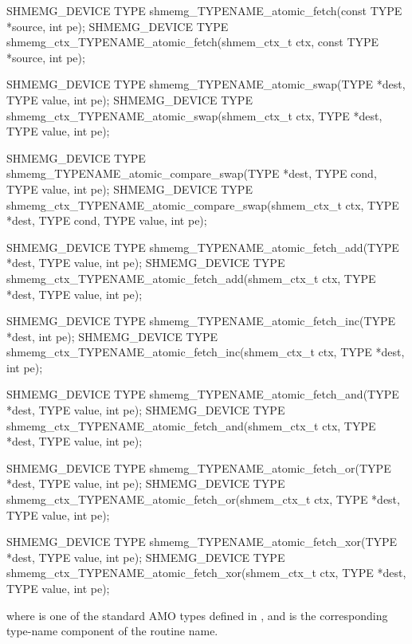 \begin{apidefinition}
\begin{Csynopsis}
SHMEMG_DEVICE TYPE shmemg_TYPENAME_atomic_fetch(const TYPE *source, int pe);
SHMEMG_DEVICE TYPE shmemg_ctx_TYPENAME_atomic_fetch(shmem_ctx_t ctx,
    const TYPE *source, int pe);

SHMEMG_DEVICE TYPE shmemg_TYPENAME_atomic_swap(TYPE *dest, TYPE value, int pe);
SHMEMG_DEVICE TYPE shmemg_ctx_TYPENAME_atomic_swap(shmem_ctx_t ctx,
    TYPE *dest, TYPE value, int pe);

SHMEMG_DEVICE TYPE shmemg_TYPENAME_atomic_compare_swap(TYPE *dest,
    TYPE cond, TYPE value, int pe);
SHMEMG_DEVICE TYPE shmemg_ctx_TYPENAME_atomic_compare_swap(shmem_ctx_t ctx,
    TYPE *dest, TYPE cond, TYPE value, int pe);

SHMEMG_DEVICE TYPE shmemg_TYPENAME_atomic_fetch_add(TYPE *dest,
    TYPE value, int pe);
SHMEMG_DEVICE TYPE shmemg_ctx_TYPENAME_atomic_fetch_add(shmem_ctx_t ctx,
    TYPE *dest, TYPE value, int pe);

SHMEMG_DEVICE TYPE shmemg_TYPENAME_atomic_fetch_inc(TYPE *dest, int pe);
SHMEMG_DEVICE TYPE shmemg_ctx_TYPENAME_atomic_fetch_inc(shmem_ctx_t ctx,
    TYPE *dest, int pe);

SHMEMG_DEVICE TYPE shmemg_TYPENAME_atomic_fetch_and(TYPE *dest,
    TYPE value, int pe);
SHMEMG_DEVICE TYPE shmemg_ctx_TYPENAME_atomic_fetch_and(shmem_ctx_t ctx,
    TYPE *dest, TYPE value, int pe);

SHMEMG_DEVICE TYPE shmemg_TYPENAME_atomic_fetch_or(TYPE *dest,
    TYPE value, int pe);
SHMEMG_DEVICE TYPE shmemg_ctx_TYPENAME_atomic_fetch_or(shmem_ctx_t ctx,
    TYPE *dest, TYPE value, int pe);

SHMEMG_DEVICE TYPE shmemg_TYPENAME_atomic_fetch_xor(TYPE *dest,
    TYPE value, int pe);
SHMEMG_DEVICE TYPE shmemg_ctx_TYPENAME_atomic_fetch_xor(shmem_ctx_t ctx,
    TYPE *dest, TYPE value, int pe);
\end{Csynopsis}

where \TYPE{} is one of the standard AMO types defined in , and
\TYPENAME{} is the corresponding type-name component of the routine name.

\begin{apiarguments}
\end{apiarguments}


\end{apidefinition}
